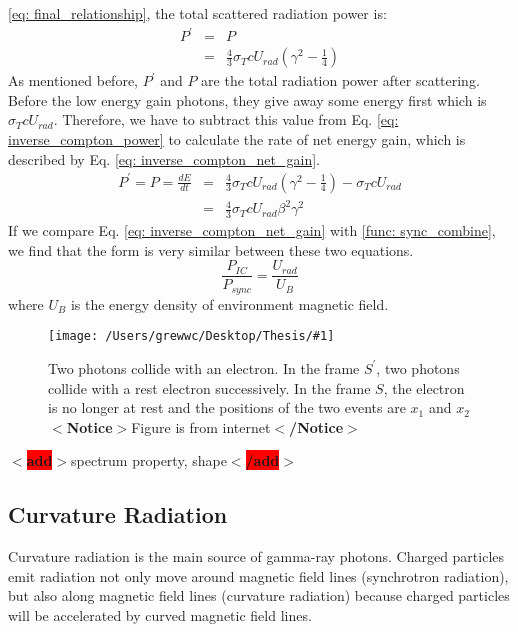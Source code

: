 \documentclass[12pt]{report}
\newcommand{\mycaption}[1]{\protect \caption{#1}}
\newcommand{\singleFig}[3]{
 \begin{figure}[!ht]
  \centering
  \texttt{[image: /Users/grewwc/Desktop/Thesis/\#1]}
  \mycaption{#3}
 \label{fig: #1}
 \end{figure}
}
\newcommand{\add}[1]{
  $<$\colorbox{red}{\textbf{add}}$>$#1$<$\colorbox{red}{\textbf{/add}}$>$
}
\newcommand{\Notice}[1]{
  $<$\textbf{Notice}$>$#1$<$\textbf{/Notice}$>$
}
\begin{document}
            \ref{eq: final_relationship}, the total scattered radiation power is:
            \begin{eqnarray}
              \label{eq: inverse_compton_power}
              P^{\prime} &=& P  \nonumber \\
                        &=& \frac{4}{3} \sigma_{T} c U_{rad} \left(\gamma^2 - \frac{1}{4}\right)
            \end{eqnarray}
            As mentioned before, $P^{\prime}$ and $P$ are the total radiation power after scattering. Before the 
            low energy gain photons, they give away some energy first which is $\sigma_{T} c U_{rad}$. 
            Therefore, we have to subtract this value from Eq. \ref{eq: inverse_compton_power} to 
            calculate the rate of net energy gain, which is described by Eq. 
            \ref{eq: inverse_compton_net_gain}.
            \begin{eqnarray}
              \label{eq: inverse_compton_net_gain}
              P^{\prime} = P = \frac{dE}{dt} &=& \frac{4}{3} \sigma_{T} c U_{rad} \left(\gamma^2 - \frac{1}{4}\right) - \sigma_{T} c U_{rad} \nonumber \\
                                            &=& \frac{4}{3} \sigma_{T} c U_{rad} \beta^{2} \gamma^{2}
            \end{eqnarray}
            If we compare Eq. \ref{eq: inverse_compton_net_gain} with \ref{func: sync_combine}, we 
            find that the form is very similar between these two equations. 
            \begin{equation}
              \label{eq: comparision_inverse_compton_and_sync}
              \frac{P_{IC}}{P_{sync}} = \frac{U_{rad}}{U_{B}}
            \end{equation}
            where $U_{B}$ is the energy density of environment magnetic field. 

            \vspace{1cm}
            \singleFig{inverse_compton_time_interval}{0.45}{Two photons collide with an electron. 
              In the frame $S^{\prime}$, two photons collide with a rest electron successively.
              In the frame $S$, the electron is no longer at rest and the positions of the two events 
              are $x_1$ and $x_2$ \Notice{Figure is from internet}}

          \add{spectrum property, shape}
        
        \subsection{Curvature Radiation}
          Curvature radiation is the main source of gamma-ray photons. Charged particles emit 
          radiation not only move around magnetic field lines (synchrotron radiation), 
          but also along magnetic field lines (curvature radiation) because charged particles will be 
          accelerated by curved magnetic field lines. 
\end{document}
